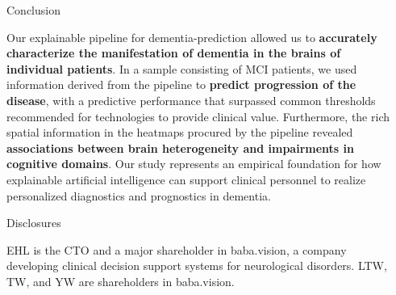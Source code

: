 \documentclass[final,11pt]{beamer}
\begin{document}
\begin{frame}[t]
        \begin{columns}[t]
            \begin{column}{.6\textwidth}
                
            \end{column}
            \hspace{1.9cm}
            \begin{column}{.3\textwidth}
                \vspace{1cm}
                \begin{block}{Conclusion}
                    \parbox{\textwidth}{\justify
Our explainable pipeline for dementia-prediction allowed us to \textbf{accurately characterize the manifestation of dementia in the brains of individual patients}. In a sample consisting of MCI patients, we used information derived from the pipeline to \textbf{predict progression of the disease}, with a predictive performance that surpassed common thresholds recommended for technologies to provide clinical value. Furthermore, the rich spatial information in the heatmaps procured by the pipeline revealed \textbf{associations between brain heterogeneity and impairments in cognitive domains}. Our study represents an empirical foundation for how explainable artificial intelligence can support clinical personnel to realize personalized diagnostics and prognostics in dementia.
                    }
                \end{block}
                \vspace{1.5cm}
                \begin{block}{Disclosures}
                    \parbox{\textwidth}{\justify
EHL is the CTO and a major shareholder in baba.vision, a company developing clinical decision support systems for neurological disorders. LTW, TW, and YW are shareholders in baba.vision.
                    }
                \end{block}
            \end{column}
        \end{columns}

        \vspace{0.5cm}


\end{frame}
\end{document}

